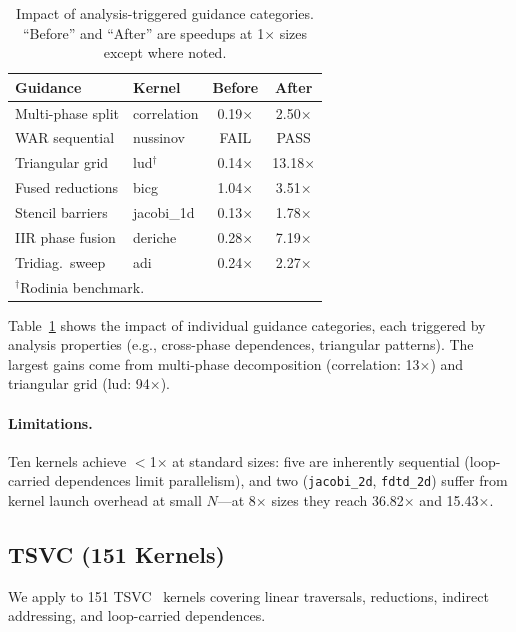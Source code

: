 \begin{table}[t]
  \caption{Impact of analysis-triggered guidance categories.
    ``Before'' and ``After'' are speedups at 1$\times$ sizes
    except where noted.}
  \label{tab:guidance_fixes}
  \centering\small
  \begin{tabular}{llcc}
    \toprule
    \textbf{Guidance} & \textbf{Kernel} & \textbf{Before} & \textbf{After} \\
    \midrule
    Multi-phase split      & correlation & 0.19$\times$ & 2.50$\times$ \\
    WAR sequential         & nussinov    & FAIL          & PASS         \\
    Triangular grid        & lud$^\dagger$ & 0.14$\times$ & 13.18$\times$ \\
    Fused reductions       & bicg        & 1.04$\times$ & 3.51$\times$ \\
    Stencil barriers       & jacobi\_1d  & 0.13$\times$ & 1.78$\times$ \\
    IIR phase fusion       & deriche     & 0.28$\times$ & 7.19$\times$ \\
    Tridiag.\ sweep        & adi         & 0.24$\times$ & 2.27$\times$ \\
    \bottomrule
    \multicolumn{4}{l}{\scriptsize $^\dagger$Rodinia benchmark.}
  \end{tabular}
\end{table}

Table~\ref{tab:guidance_fixes} shows the impact of individual
guidance categories, each triggered by analysis properties
(e.g., cross-phase dependences, triangular patterns).
The largest gains come from multi-phase decomposition
(correlation: 13$\times$) and triangular grid
(lud: 94$\times$).

\paragraph{Limitations.}
Ten kernels achieve $<$1$\times$ at standard sizes: five are
inherently sequential (loop-carried dependences limit parallelism),
and two (\texttt{jacobi\_2d}, \texttt{fdtd\_2d}) suffer from
kernel launch overhead at small $N$---at 8$\times$ sizes they reach
36.82$\times$ and 15.43$\times$.


\subsection{TSVC (151 Kernels)}
\label{sec:tsvc}

We apply \sysname to 151 TSVC~\cite{callahan1988tsvc} kernels
covering linear traversals, reductions, indirect addressing,
and loop-carried dependences.

